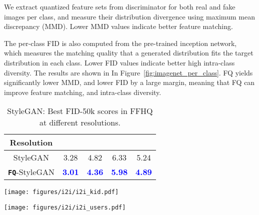 \documentclass{article}
\begin{document}
We extract quantized feature sets from discriminator for both real and fake images per class, and measure their distribution divergence using maximum mean discrepancy (MMD). Lower MMD values indicate better feature matching.
 
The per-class FID is also computed from the pre-trained inception network, which measures the matching quality that a generated distribution fits the target distribution in each class. Lower FID values indicate better high intra-class diversity. 
The results are shown in In Figure~\ref{fig:imagenet_per_class}. FQ yields significantly lower MMD, and lower FID by a large margin, meaning that FQ can improve feature matching, and intra-class diversity. 





\begin{table}[!t]
    \centering
    \begin{tabular}{c|c|c|c|c}
    \toprule
    Resolution & &  &  &  \\ \midrule
    StyleGAN  & 3.28 & 4.82 & 6.33 & 5.24\\
    \rowcolor{Gray} 
    \textbf{\texttt{FQ}}-StyleGAN & 
    \textcolor{blue}{\textbf{3.01}} & 
    \textcolor{blue}{\textbf{4.36}} & 
    \textcolor{blue}{\textbf{5.98}} &
    \textcolor{blue}{\textbf{4.89}}\\
    \bottomrule
    \end{tabular}
     \vspace{-2mm}
    \caption{StyleGAN: Best FID-50k scores in FFHQ at different resolutions.}
    \label{tab:ffhq}
    \vspace{-2mm}
\end{table}



\begin{figure*}[t!]
\begin{minipage}[b]{0.7\textwidth} 
\centering
 \texttt{[image: figures/i2i/i2i\_kid.pdf]}
    \vspace{-2mm}
    \label{tab:i2i_kid}
\end{minipage}
\hfill 
\begin{minipage}[b]{0.25\textwidth} 
\centering
 \texttt{[image: figures/i2i/i2i\_users.pdf]}
    \vspace{-3mm}
    \label{tab:i2i_userstudy}
\end{minipage}
\end{figure*}
\end{document}
